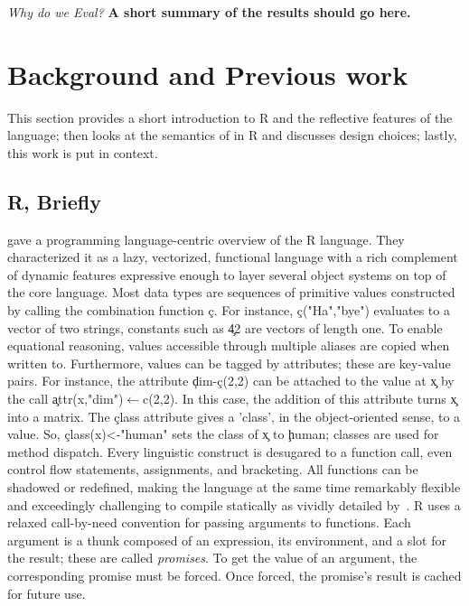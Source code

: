\documentclass[review,screen,acmsmall,anonymous=true]{acmart}
\begin{document}
\vspace{2mm}\noindent\emph{Why do we Eval?} {\bf A short summary of the
results should go here.}


\newpage
\section{Background and Previous work}

This section provides a short introduction to R and the reflective features of
the language; then looks at the semantics of \eval in R and discusses design
choices; lastly, this work is put in context.

\subsection{R, Briefly}

\citet{ecoop12} gave a programming language-centric overview of the R language.
They characterized it as a lazy, vectorized, functional language with a rich
complement of dynamic features expressive enough to layer several object systems
on top of the core language. Most data types are sequences of primitive values
constructed by calling the combination function \c{c}. For instance,
\c{c("Ha","bye")} evaluates to a vector of two strings, constants such as \c{42}
are vectors of length one. To enable equational reasoning, values accessible
through multiple aliases are copied when written to. Furthermore, values can be
tagged by attributes; these are key-value pairs. For instance, the attribute
\c{dim}-\c{c(2,2)} can be attached to the value at \c{x} by the call
\c{attr(x,"dim")$\leftarrow$c(2,2)}. In this case, the addition of this
attribute turns \c x into a matrix. The \c{class} attribute gives a 'class', in
the object-oriented sense, to a value. So, \c{class(x)<-"human"} sets the class
of \c{x} to \c{human}; classes are used for method dispatch. Every linguistic
construct is desugared to a function call, even control flow statements,
assignments, and bracketing. All functions can be shadowed or redefined, making
the language at the same time remarkably flexible and exceedingly challenging to
compile statically as vividly detailed by~\citet{dls19}. R uses a relaxed
call-by-need convention for passing arguments to functions. Each argument is a
thunk composed of an expression, its environment, and a slot for the result;
these are called \emph{promises}. To get the value of an argument, the
corresponding promise must be forced. Once forced, the promise's result is cached
for future use.
\end{document}

